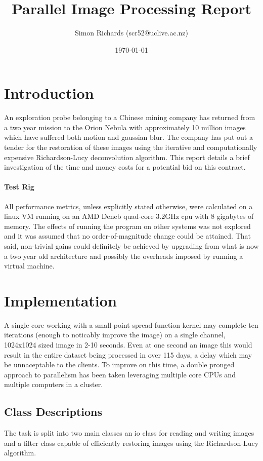 \documentclass{article}
\title{Parallel Image Processing Report}
\date{\today}
\author{Simon Richards (scr52@uclive.ac.nz)}
\begin{document}
\maketitle
\section{Introduction}
An exploration probe belonging to a Chinese mining company has returned from a
two year mission to the Orion Nebula with  approximately 10 million images which
have suffered both motion and gaussian blur. The company has put out a tender
for the restoration of these images using the iterative and computationally
expensive Richardson-Lucy deconvolution algorithm. This report details a brief
investigation of the time and money costs for a potential bid on this contract.

\paragraph{Test Rig}
All performance metrics, unless explicitly stated otherwise, were calculated on
a linux VM running on an AMD Deneb quad-core 3.2GHz cpu with 8 gigabytes of
memory. The effects of running the program on other systems was not explored and
it was assumed that no order-of-magnitude change could be attained. That said,
non-trivial gains could definitely be achieved by upgrading from what is now a
two year old architecture and possibly the overheads imposed by running a
virtual machine.

\section{Implementation}
A single core working with a small point spread function kernel may complete ten
iterations (enough to noticably improve the image) on a single channel,
1024x1024 sized image in 2-10 seconds. Even at one second an image this would
result in the entire dataset being processed in over 115 days, a delay which may
be unnaceptable to the clients. To improve on this time, a double pronged
approach to parallelism has been taken leveraging multiple core CPUs and
multiple computers in a cluster.

\subsection{Class Descriptions}
The task is split into two main classes an io class for reading and writing
images and a filter class capable of efficiently restoring images using the
Richardson-Lucy algorithm.
\end{document}
